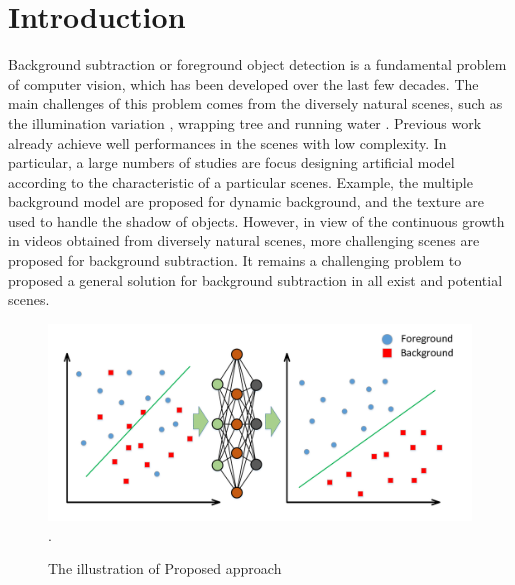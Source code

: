 \documentclass[journal]{IEEEtran}
\begin{document}
\section{Introduction}
Background subtraction or foreground object detection is a fundamental problem of computer vision, 
which has been developed over the last few decades.
The main challenges of this problem comes from the diversely natural scenes,
such as the illumination variation \cite{2017_REVIEW_7914756}, wrapping tree \cite{2014_CVIU_SOBRAL20144} and running water \cite{Bouwmans2014}.
Previous work already achieve well performances in the scenes with low complexity.
In particular,
a large numbers of studies are focus designing artificial model according to the characteristic of a particular scenes.
Example, the multiple background model are proposed for dynamic background,
and the texture are used to handle the shadow of objects.
However, in view of the continuous growth in videos obtained from diversely natural scenes,
more challenging scenes are proposed for background subtraction.
It remains a challenging problem to proposed a general solution for background subtraction in all exist and potential scenes.
%
% 
% 
% 
% 
\begin{figure}[!t]	%
\centering
\includegraphics[width=.5\textwidth]{figure/fig1}
\DeclareGraphicsExtensions.
    \caption{The illustration of Proposed approach}
\label{fig_FBMS_nobk}
\end{figure}
\end{document}
